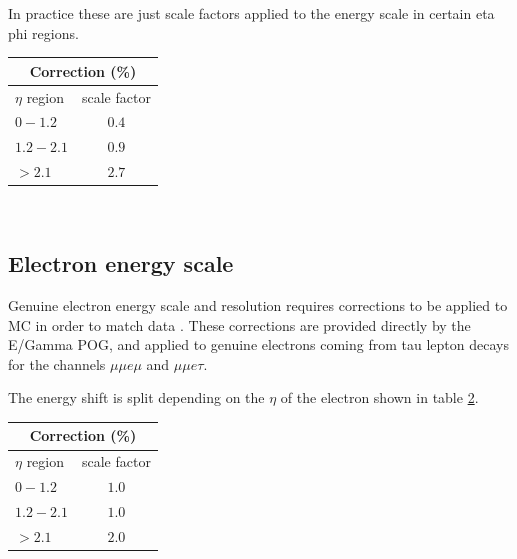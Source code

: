 In practice these are just scale factors applied to the energy scale in certain eta phi regions. \\
\begin{table}[h]
  \begin{center}
    \label{tab:MES}
    \begin{tabular} { l | c }
      \hline \multicolumn{2}{c}{Correction (\%)} \\
      \hline $\eta$ region & scale factor  \\ \hline
      $0 - 1.2$ & $0.4$ \\ 
      $1.2 - 2.1 $& $0.9 $\\ 
      $> 2.1$ & $2.7$ \\ 
    \end{tabular}
  \end{center}
\end{table}\\

\subsection{Electron energy scale}

Genuine electron energy scale and resolution requires corrections to be applied to MC in order to match data \cite{EGammaEnergyScale}. These corrections are provided directly by the E/Gamma POG, and applied to genuine electrons coming from tau lepton decays for the channels $\mu\mu e \mu$ and $\mu\mu e \tau$.

The energy shift is split depending on the $\eta$ of the electron shown in table \ref{tab:EES}.\\
\begin{table}[h]
  \begin{center}
    \label{tab:EES}
    \begin{tabular} { l | c }
      \hline \multicolumn{2}{c}{Correction (\%)} \\
      \hline $\eta$ region & scale factor  \\ \hline
      $0 - 1.2$ & $1.0$ \\ 
      $1.2 - 2.1 $& $1.0 $\\ 
      $> 2.1$ & $2.0$ \\ 
    \end{tabular}
  \end{center}
\end{table}\\


